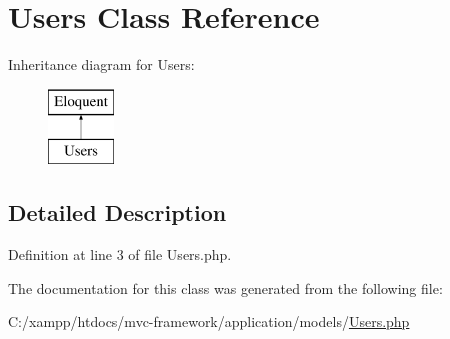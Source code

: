 \hypertarget{class_users}{}\section{Users Class Reference}
\label{class_users}
Inheritance diagram for Users\+:\begin{figure}[H]
\begin{center}
\leavevmode
\includegraphics[height=2.000000cm]{class_users}
\end{center}
\end{figure}


\subsection{Detailed Description}


Definition at line 3 of file Users.\+php.



The documentation for this class was generated from the following file\+:\begin{DoxyCompactItemize}
\item 
C\+:/xampp/htdocs/mvc-\/framework/application/models/\hyperlink{_users_8php}{Users.\+php}\end{DoxyCompactItemize}
